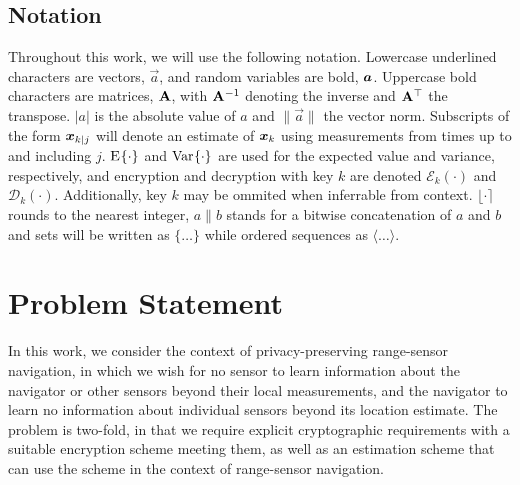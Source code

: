 \documentclass[10pt,letterpaper,oneside,twocolumn,journal]{IEEEtran}
\theoremstyle{definition}
\theoremstyle{definition}
\theoremstyle{remark}
\begin{document}
\subsection{Notation}
Throughout this work, we will use the following notation. Lowercase underlined characters are vectors, $\vec{a}$, and random variables are bold, ${\boldsymbol{a}}$. Uppercase bold characters are matrices, ${{\mathbf{A}}}$, with ${{\mathbf{A}}}^{-1}$ denoting the inverse and ${{\mathbf{A}}}^\top$ the transpose. $|a|$ is the absolute value of $a$ and $\lVert\vec{a}\rVert$ the vector norm. Subscripts of the form ${\boldsymbol{x}}_{k|j}$ will denote an estimate of ${\boldsymbol{x}}_k$ using measurements from times up to and including $j$. $\E{\cdot}$ and $\Var{\cdot}$ are used for the expected value and variance, respectively, and encryption and decryption with key $k$ are denoted $\mathcal{E}_{k}(\cdot)$ and $\mathcal{D}_{k}(\cdot)$. Additionally, key $k$ may be ommited when inferrable from context. $\lfloor\cdot\rceil$ rounds to the nearest integer, $a\|b$ stands for a bitwise concatenation of $a$ and $b$ and sets will be written as $\{\dots\}$ while ordered sequences as $\langle\dots\rangle$.

% 
%                                                                                
%                                                                                
%                                                                                
% 

\section{Problem Statement} \label{sec:problem_statement}
In this work, we consider the context of privacy-preserving range-sensor navigation, in which we wish for no sensor to learn information about the navigator or other sensors beyond their local measurements, and the navigator to learn no information about individual sensors beyond its location estimate. The problem is two-fold, in that we require explicit cryptographic requirements with a suitable encryption scheme meeting them, as well as an estimation scheme that can use the scheme in the context of range-sensor navigation.
\end{document}

